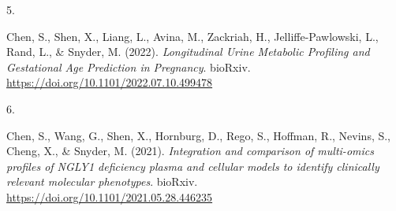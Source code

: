 \documentclass[11pt,a4paper,]{moderncv}
\newlength{\csllabelwidth}
\newcommand{\CSLLeftMargin}[1]{\parbox[t]{\csllabelwidth}{#1}}
\newcommand{\CSLRightInline}[1]{\parbox[t]{\linewidth - \csllabelwidth}{#1}}
\begin{document}
\leavevmode{}%
\CSLLeftMargin{5. }%
\CSLRightInline{Chen, S., Shen, X., Liang, L., Avina, M., Zackriah, H.,
Jelliffe-Pawlowski, L., Rand, L., \& Snyder, M. (2022).
\emph{Longitudinal Urine Metabolic Profiling and Gestational Age
Prediction in Pregnancy}. bioRxiv.
\url{https://doi.org/10.1101/2022.07.10.499478}}

\leavevmode{}%
\CSLLeftMargin{6. }%
\CSLRightInline{Chen, S., Wang, G., Shen, X., Hornburg, D., Rego, S.,
Hoffman, R., Nevins, S., Cheng, X., \& Snyder, M. (2021).
\emph{Integration and comparison of multi-omics profiles of NGLY1
deficiency plasma and cellular models to identify clinically relevant
molecular phenotypes}. bioRxiv.
\url{https://doi.org/10.1101/2021.05.28.446235}}
\end{document}
